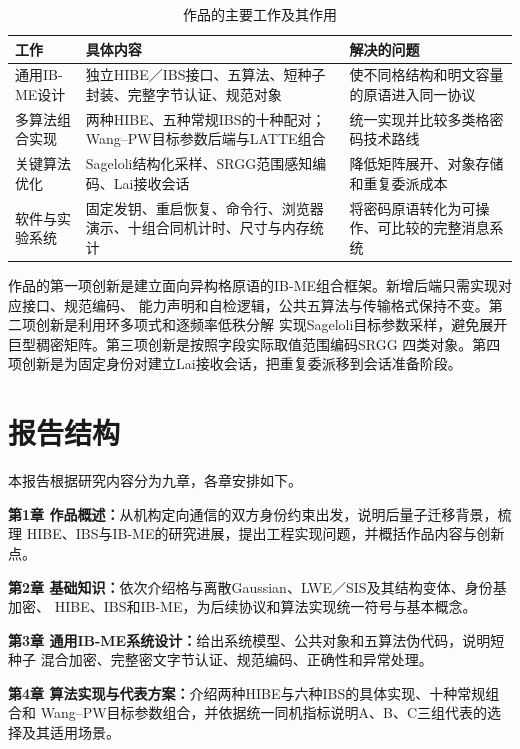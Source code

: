 \begin{table}[H]
\centering\small
\caption{作品的主要工作及其作用}
\label{tab:main-contributions}
\begin{tabularx}{\textwidth}{@{}>{\raggedright\arraybackslash}p{}>{\raggedright\arraybackslash}p{}>{\raggedright\arraybackslash}X@{}}
\toprule
\rowcolor{black!8} 工作 & 具体内容 & 解决的问题 \\
\midrule
通用IB-ME设计 & 独立HIBE／IBS接口、五算法、短种子封装、完整字节认证、规范对象 & 使不同格结构和明文容量的原语进入同一协议 \\
多算法组合实现 & 两种HIBE、五种常规IBS的十种配对；Wang--PW目标参数后端与LATTE组合 & 统一实现并比较多类格密码技术路线 \\
关键算法优化 & Sageloli结构化采样、SRGG范围感知编码、Lai接收会话 & 降低矩阵展开、对象存储和重复委派成本 \\
软件与实验系统 & 固定发钥、重启恢复、命令行、浏览器演示、十组合同机计时、尺寸与内存统计 & 将密码原语转化为可操作、可比较的完整消息系统 \\
\bottomrule
\end{tabularx}
\end{table}

作品的第一项创新是建立面向异构格原语的IB-ME组合框架。新增后端只需实现对应接口、规范编码、
能力声明和自检逻辑，公共五算法与传输格式保持不变。第二项创新是利用环多项式和逐频率低秩分解
实现Sageloli目标参数采样，避免展开巨型稠密矩阵。第三项创新是按照字段实际取值范围编码SRGG
四类对象。第四项创新是为固定身份对建立Lai接收会话，把重复委派移到会话准备阶段。

\section{报告结构}

本报告根据研究内容分为九章，各章安排如下。

\noindent\textbf{第1章 作品概述：}从机构定向通信的双方身份约束出发，说明后量子迁移背景，梳理
HIBE、IBS与IB-ME的研究进展，提出工程实现问题，并概括作品内容与创新点。

\noindent\textbf{第2章 基础知识：}依次介绍格与离散Gaussian、LWE／SIS及其结构变体、身份基加密、
HIBE、IBS和IB-ME，为后续协议和算法实现统一符号与基本概念。

\noindent\textbf{第3章 通用IB-ME系统设计：}给出系统模型、公共对象和五算法伪代码，说明短种子
混合加密、完整密文字节认证、规范编码、正确性和异常处理。

\noindent\textbf{第4章 算法实现与代表方案：}介绍两种HIBE与六种IBS的具体实现、十种常规组合和
Wang--PW目标参数组合，并依据统一同机指标说明A、B、C三组代表的选择及其适用场景。


